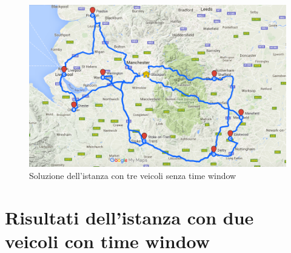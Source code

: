 		\begin{figure}[H]
			\centering
			\includegraphics[keepaspectratio=true, width=14cm]{img/mappa_soluzione_3.png}
			\caption{Soluzione dell'istanza con tre veicoli senza time window}
			\label{fig:map_soluzione_3}
		\end{figure}

	\section{Risultati dell’istanza con due veicoli con time window}
	\label{sec:istanza_due_veicoli_con_time_window}

